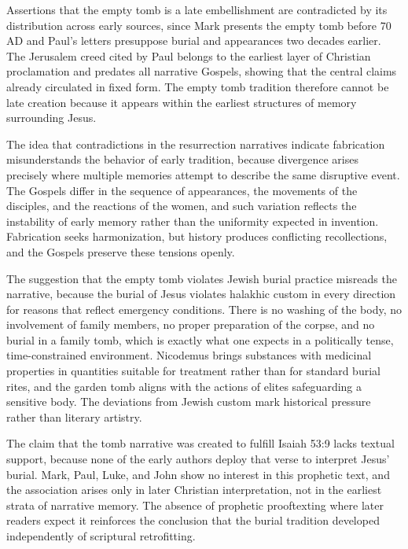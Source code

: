 Assertions that the empty tomb is a late embellishment are contradicted by its distribution across early sources, since Mark presents the empty tomb before 70 AD and Paul's letters presuppose burial and appearances two decades earlier.
The Jerusalem creed cited by Paul belongs to the earliest layer of Christian proclamation and predates all narrative Gospels, showing that the central claims already circulated in fixed form.
The empty tomb tradition therefore cannot be late creation because it appears within the earliest structures of memory surrounding Jesus.

The idea that contradictions in the resurrection narratives indicate fabrication misunderstands the behavior of early tradition, because divergence arises precisely where multiple memories attempt to describe the same disruptive event.
The Gospels differ in the sequence of appearances, the movements of the disciples, and the reactions of the women, and such variation reflects the instability of early memory rather than the uniformity expected in invention.
Fabrication seeks harmonization, but history produces conflicting recollections, and the Gospels preserve these tensions openly.

The suggestion that the empty tomb violates Jewish burial practice misreads the narrative, because the burial of Jesus violates halakhic custom in every direction for reasons that reflect emergency conditions.
There is no washing of the body, no involvement of family members, no proper preparation of the corpse, and no burial in a family tomb, which is exactly what one expects in a politically tense, time-constrained environment.
Nicodemus brings substances with medicinal properties in quantities suitable for treatment rather than for standard burial rites, and the garden tomb aligns with the actions of elites safeguarding a sensitive body.
The deviations from Jewish custom mark historical pressure rather than literary artistry.

The claim that the tomb narrative was created to fulfill Isaiah 53:9 lacks textual support, because none of the early authors deploy that verse to interpret Jesus' burial.
Mark, Paul, Luke, and John show no interest in this prophetic text, and the association arises only in later Christian interpretation, not in the earliest strata of narrative memory.
The absence of prophetic prooftexting where later readers expect it reinforces the conclusion that the burial tradition developed independently of scriptural retrofitting.

